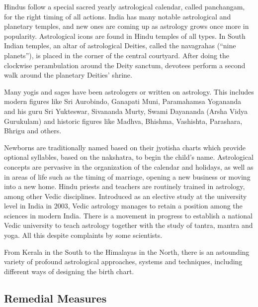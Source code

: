  

Hindus follow a special sacred yearly astrological calendar, called panchangam, for the right timing of all actions. India has many notable astrological and planetary temples, and new ones are coming up as astrology grows once more in popularity. Astrological icons are found in Hindu temples of all types. In South Indian temples, an altar of astrological Deities, called the navagrahas (“nine planets”), is placed in the corner of the central courtyard. After doing the clockwise perambulation around the Deity sanctum, devotees perform a second walk around the planetary Deities’ shrine.

 

Many yogis and sages have been astrologers or written on astrology. This includes modern figures like Sri Aurobindo, Ganapati Muni, Paramahamsa Yogananda and his guru Sri Yukteswar, Sivananda Murty, Swami Dayananda (Arsha Vidya Gurukulam) and historic figures like Madhva, Bhishma, Vashishta, Parashara, Bhrigu and others.

 

Newborns are traditionally named based on their jyotisha charts which provide optional syllables, based on the nakshatra, to begin the child’s name. Astrological concepts are pervasive in the organization of the calendar and holidays, as well as in areas of life such as the timing of marriage, opening a new business or moving into a new home. Hindu priests and teachers are routinely trained in astrology, among other Vedic disciplines. Introduced as an elective study at the university level in India in 2003, Vedic astrology manages to retain a position among the sciences in modern India. There is a movement in progress to establish a national Vedic university to teach astrology together with the study of tantra, mantra and yoga. All this despite complaints by some scientists.

 

From Kerala in the South to the Himalayas in the North, there is an astounding variety of profound astrological approaches, systems and techniques, including different ways of designing the birth chart.

 

\subsection{Remedial Measures}

